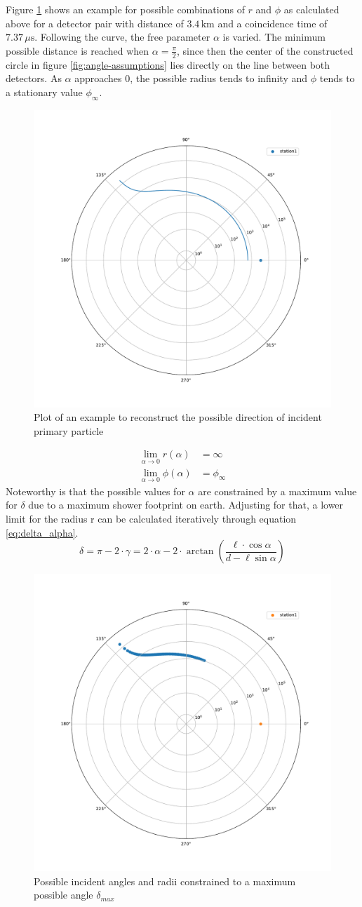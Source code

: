 \documentclass[abstract,toc,los,lof,english,10pt,glossary,acronyms,lotl]{jluthesis}
\begin{document}
Figure \ref{fig:reconstruction_example} shows an example for possible combinations of $r$ and $\phi$ as calculated above for a detector pair with distance of $3.4\,\text{km}$ and a coincidence time of $7.37\,\mu\text{s}$. Following the curve, the free parameter $\alpha$ is varied. The minimum possible distance is reached when $\alpha=\frac{\pi}{2}$, since then the center of the constructed circle in figure \ref{fig:angle-assumptions} lies directly on the line between both detectors. As $\alpha$ approaches $0$, the possible radius tends to infinity and $\phi$ tends to a stationary value $\phi_\infty$.
\begin{figure}[ht!]
	\centering
	\includegraphics[width=0.4\linewidth]{data/example_plot_vertical}
	\caption{Plot of an example to reconstruct the possible direction of incident primary particle}
	\label{fig:reconstruction_example}
\end{figure}
\begin{equation*}
	\begin{aligned}
		\lim_{\alpha\rightarrow0}r\left(\alpha\right) &= \infty\\
		\lim_{\alpha\rightarrow0}\phi\left(\alpha\right) &= \phi_\infty
	\end{aligned}
\end{equation*}
Noteworthy is that the possible values for $\alpha$ are constrained by a maximum value for $\delta$ due to a maximum shower footprint on earth. Adjusting for that, a lower limit for the radius r can be calculated iteratively through equation \ref{eq:delta_alpha}.
\begin{equation}\label{eq:delta_alpha}
	\delta = \pi - 2\cdot\gamma = 2\cdot\alpha - 2\cdot\arctan\left(\frac{\ell\cdot\cos\alpha}{d - \ell\sin\alpha}\right)
\end{equation}
\begin{figure}[ht!]
	\centering
	\includegraphics[width=0.4\linewidth]{data/example_plot_vertical_constrained}
	\caption{Possible incident angles and radii constrained to a maximum possible angle $\delta_{max}$}
	\label{fig:reconstruction_example_constrained}
\end{figure}
\end{document}
